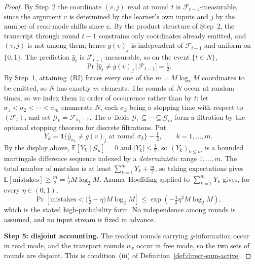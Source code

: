 \documentclass[12pt]{article}
\theoremstyle{definition}
\newcommand{\ind}[1]{\mathbf 1\{#1\}}
\begin{document}
\begin{proof}
By Step~2 the coordinate $(v,j)$ read at round $t$ is
$\mathcal F_{t-1}$-measurable, since the argument $v$ is determined by the
learner's own inputs and $j$ by the number of read-mode shifts since
$\mathtt c$.  By the product structure of Step~2, the transcript through round
$t-1$ constrains only coordinates already emitted, and $(v,j)$ is not among
them; hence $g(v)_j$ is independent of $\mathcal F_{t-1}$ and uniform on
$\{0,1\}$.  The prediction $\hat y_t$ is $\mathcal F_{t-1}$-measurable, so on
the event $\{t\in N\}$,
\[
\Pr\bigl[\hat y_t\ne g(v)_j \,\big|\, \mathcal F_{t-1}\bigr]=\tfrac12 .
\]
By Step~1, attaining~(RI) forces every one of the $m=M\log_2M$ coordinates to
be emitted, so $N$ has exactly $m$ elements.  The rounds of $N$ occur at random
times, so we index them in order of occurrence rather than by $t$: let
$\sigma_1<\sigma_2<\cdots<\sigma_m$ enumerate $N$, each $\sigma_k$ being a
stopping time with respect to $(\mathcal F_t)$, and set
$\mathcal G_k=\mathcal F_{\sigma_k-1}$.  The $\sigma$-fields
$\mathcal G_1\subseteq\cdots\subseteq\mathcal G_m$ form a filtration by the
optional stopping theorem for discrete filtrations.  Put
\[
Y_k
=
\ind{\hat y_{\sigma_k}\ne g(v)_j\text{ at round }\sigma_k}-\tfrac12 ,
\qquad k=1,\dots,m .
\]
By the display above, $\mathbb E[Y_k\mid\mathcal G_k]=0$ and $|Y_k|\le\tfrac12$,
so $(Y_k)_{k\le m}$ is a bounded martingale difference sequence indexed by a
\emph{deterministic} range $1,\dots,m$.  The total number of mistakes is at
least $\sum_{k=1}^mY_k+\tfrac m2$, so taking expectations gives
$\mathbb E[\text{mistakes}]\ge\tfrac m2=\tfrac12M\log_2M$.  Azuma--Hoeffding
applied to $\sum_{k=1}^mY_k$ \cite[Ch.~6]{boucheron2013} gives, for every
$\eta\in(0,1)$,
\[
\Pr\left[\text{mistakes}<\bigl(\tfrac12-\eta\bigr)M\log_2M\right]
\le
\exp\!\left(-\tfrac12\eta^2M\log_2M\right),
\]
which is the stated high-probability form.  No independence among rounds is
assumed, and no input stream is fixed in advance.

\textbf{Step 5: disjoint accounting.}
The readout rounds carrying $g$-information occur in read mode, and the
transport rounds $w_v$ occur in free mode, so the two sets of rounds are
disjoint.  This is condition~(iii) of
Definition~\ref{def:direct-sum-active}.
\end{proof}
\end{document}
